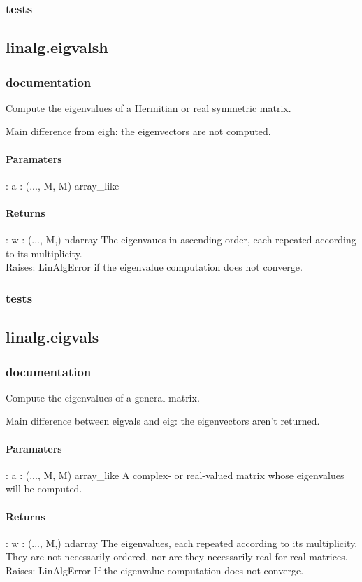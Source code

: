 \documentclass[a4paper,11pt]{article}
\begin{document}
\subsubsection{tests}
\subsection{linalg.eigvalsh}
\subsubsection{documentation}
Compute the eigenvalues of a Hermitian or real symmetric matrix.

Main difference from eigh: the eigenvectors are not computed.
\paragraph{Paramaters}: 
a : (..., M, M) array\_like\\
\paragraph{Returns}:    
w : (..., M,) ndarray
The eigenvaues in ascending order, each repeated according to its multiplicity.\\
Raises: 
LinAlgError if the eigenvalue computation does not converge.

\subsubsection{tests}
\subsection{linalg.eigvals}
\subsubsection{documentation}
Compute the eigenvalues of a general matrix.

Main difference between eigvals and eig: the eigenvectors aren’t returned.


\paragraph{Paramaters}: 
a : (..., M, M) array\_like
A complex- or real-valued matrix whose eigenvalues will be computed.\\
\paragraph{Returns}:    
w : (..., M,) ndarray
The eigenvalues, each repeated according to its multiplicity. They are not necessarily ordered, nor are they necessarily real for real matrices.\\
Raises: 
LinAlgError
If the eigenvalue computation does not converge.\\
\end{document}
